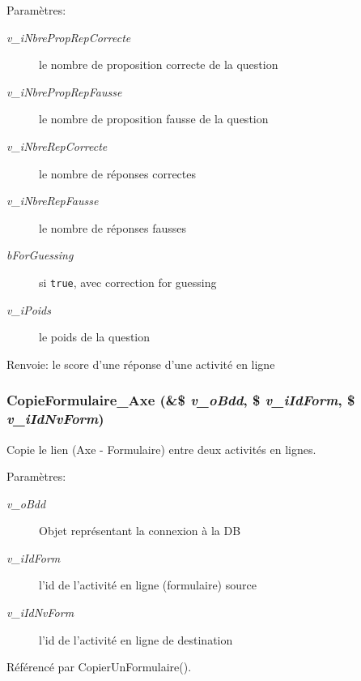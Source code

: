 \begin{Desc}
\item[Paramètres:]
\begin{description}
\item[{\em v\_\-iNbrePropRepCorrecte}]le nombre de proposition correcte de la question \item[{\em v\_\-iNbrePropRepFausse}]le nombre de proposition fausse de la question \item[{\em v\_\-iNbreRepCorrecte}]le nombre de réponses correctes \item[{\em v\_\-iNbreRepFausse}]le nombre de réponses fausses \item[{\em bForGuessing}]si {\tt true}, avec correction for guessing \item[{\em v\_\-iPoids}]le poids de la question\end{description}
\end{Desc}
\begin{Desc}
\item[Renvoie:]le score d'une réponse d'une activité en ligne \end{Desc}
\subsubsection{\setlength{\rightskip}{0pt plus 5cm}CopieFormulaire\_\-Axe (\&\$ {\em v\_\-oBdd}, \/  \$ {\em v\_\-iIdForm}, \/  \$ {\em v\_\-iIdNvForm})}\label{fonctions__form_8inc_8php_a686c3fda524fcd49da75758c8fee6f7}


Copie le lien (Axe - Formulaire) entre deux activités en lignes. 

\begin{Desc}
\item[Paramètres:]
\begin{description}
\item[{\em v\_\-oBdd}]Objet représentant la connexion à la DB \item[{\em v\_\-iIdForm}]l'id de l'activité en ligne (formulaire) source \item[{\em v\_\-iIdNvForm}]l'id de l'activité en ligne de destination \end{description}
\end{Desc}


Référencé par CopierUnFormulaire().
